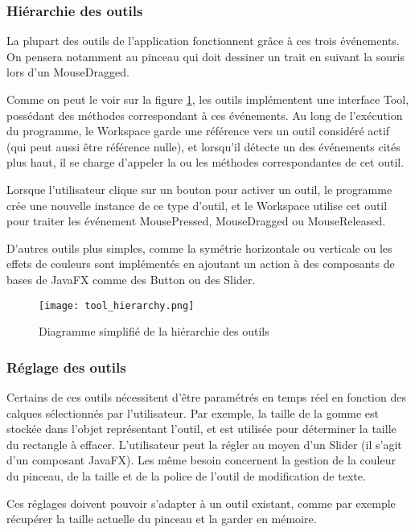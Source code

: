 \subsubsection{Hiérarchie des outils}
\par
La plupart des outils de l'application  fonctionnent grâce à ces trois événements. On pensera notamment au pinceau qui doit dessiner un trait en suivant la souris lors d'un MouseDragged. 
\par
Comme on peut le voir sur la figure \ref{fig:tool_hier}, les outils implémentent une interface Tool, possédant des méthodes correspondant à ces événements. Au long de l'exécution du programme, le Workspace garde une référence vers un outil considéré actif (qui peut aussi être référence nulle), et lorsqu'il détecte un des événements cités plus haut, il se charge d'appeler la ou les méthodes correspondantes de cet outil.
\par
Lorsque l'utilisateur clique sur un bouton pour activer un outil, le programme crée une nouvelle instance de ce type d'outil, et le Workspace utilise cet outil pour traiter les événement MousePressed, MouseDragged ou MouseReleased.
\par
D'autres outils plus simples, comme la symétrie horizontale ou verticale ou les effets de couleurs sont implémentés en ajoutant un action à des composants de bases de JavaFX comme des Button ou des Slider.
	
\begin{figure}[h]
	\caption{Diagramme simplifié de la hiérarchie des outils}
	\centering
	\texttt{[image: tool\_hierarchy.png]}
	\label{fig:tool_hier}
\end{figure}

\subsubsection{Réglage des outils}
Certains de ces outils nécessitent d'être paramétrés en temps réel en fonction des calques sélectionnés par l'utilisateur. Par exemple, la taille de la gomme est stockée dans l'objet représentant l'outil, et est utilisée pour déterminer la taille du rectangle à effacer. L'utilisateur peut la régler au moyen d'un Slider (il s'agit d'un composant JavaFX). Les même besoin concernent la gestion de la couleur du pinceau, de la taille et de la police de l'outil de modification de texte.
\par
Ces réglages doivent pouvoir s'adapter à un outil existant, comme par exemple récupérer la taille actuelle du pinceau et la garder en mémoire.

